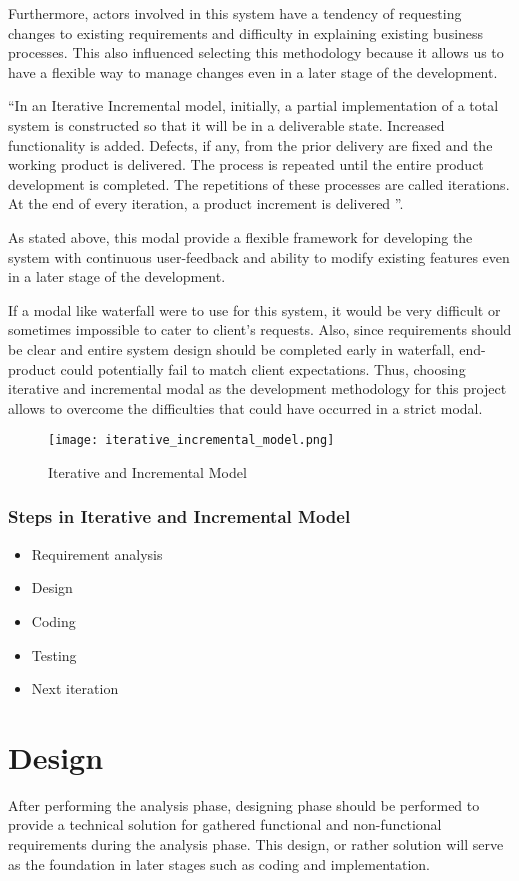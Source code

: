 \documentclass[12pt]{report}
\begin{document}
Furthermore, actors involved in this system have a tendency of requesting changes to existing requirements and difficulty in explaining existing business processes. This also influenced selecting this methodology because it allows us to have a flexible way to manage changes even in a later stage of the development.

``In an Iterative Incremental model, initially, a partial implementation of a total system is constructed so that it will be in a deliverable state. Increased functionality is added. Defects, if any, from the prior delivery are fixed and the working product is delivered. The process is repeated until the entire product development is completed. The repetitions of these processes are called iterations. At the end of every iteration, a product increment is delivered \cite{tpoint_2019_sdlc}''.

As stated above, this modal provide a flexible framework for developing the system with continuous user-feedback and ability to modify existing features even in a later stage of the development.

If a modal like waterfall were to use for this system, it would be very difficult or sometimes impossible to cater to client's requests. Also, since requirements should be clear and entire system design should be completed early in waterfall, end-product could potentially fail to match client expectations. Thus, choosing iterative and incremental modal as the development methodology for this project allows to overcome the difficulties that could have occurred in a strict modal.

\begin{figure}[H]
	\centering
	\texttt{[image: iterative\_incremental\_model.png]}
	\caption{Iterative and Incremental Model}
\end{figure}

\subsection{Steps in Iterative and Incremental Model}
\begin{itemize}
	\item Requirement analysis
	\item Design
	\item Coding
	\item Testing
	\item Next iteration
\end{itemize}

\newpage
\chapter{Design}
After performing the analysis phase, designing phase should be performed to provide a technical solution for gathered functional and non-functional requirements during the analysis phase. This design, or rather solution will serve as the foundation in later stages such as coding and implementation.
\end{document}
